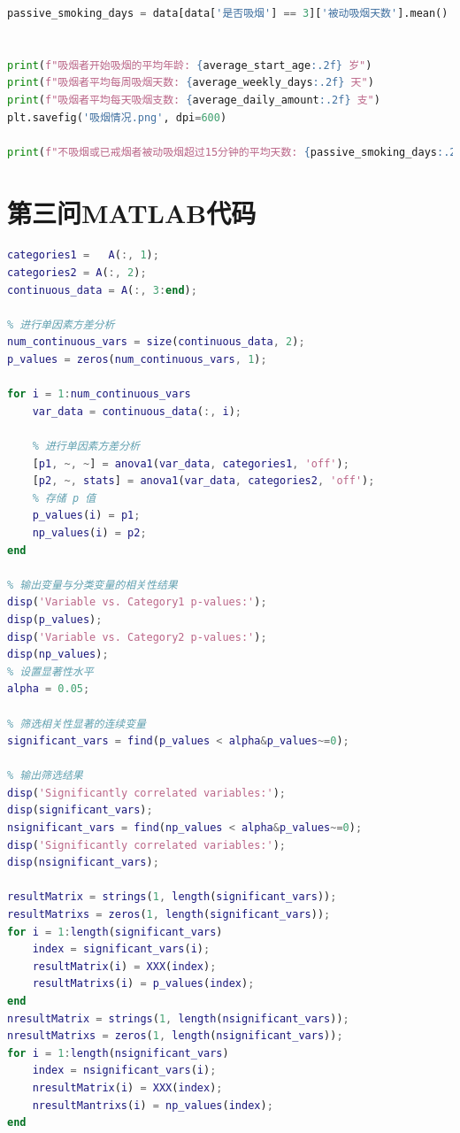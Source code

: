 \documentclass{cumcmthesis}
\begin{document}
\begin{appendices}
\begin{lstlisting}[language=python]
passive_smoking_days = data[data['是否吸烟'] == 3]['被动吸烟天数'].mean()


print(f"吸烟者开始吸烟的平均年龄: {average_start_age:.2f} 岁")
print(f"吸烟者平均每周吸烟天数: {average_weekly_days:.2f} 天")
print(f"吸烟者平均每天吸烟支数: {average_daily_amount:.2f} 支")
plt.savefig('吸烟情况.png', dpi=600)

print(f"不吸烟或已戒烟者被动吸烟超过15分钟的平均天数: {passive_smoking_days:.2f} 天")


\end{lstlisting}
\section{第三问MATLAB代码}
\begin{lstlisting}[language=matlab]
% 提取分类变量和其他连续变量
categories1 =   A(:, 1); 
categories2 = A(:, 2);   
continuous_data = A(:, 3:end); 

% 进行单因素方差分析
num_continuous_vars = size(continuous_data, 2);
p_values = zeros(num_continuous_vars, 1);

for i = 1:num_continuous_vars
    var_data = continuous_data(:, i);
    
    % 进行单因素方差分析
    [p1, ~, ~] = anova1(var_data, categories1, 'off');
    [p2, ~, stats] = anova1(var_data, categories2, 'off');
    % 存储 p 值
    p_values(i) = p1;
    np_values(i) = p2;
end

% 输出变量与分类变量的相关性结果
disp('Variable vs. Category1 p-values:');
disp(p_values);
disp('Variable vs. Category2 p-values:');
disp(np_values);
% 设置显著性水平
alpha = 0.05;

% 筛选相关性显著的连续变量
significant_vars = find(p_values < alpha&p_values~=0);

% 输出筛选结果
disp('Significantly correlated variables:');
disp(significant_vars);
nsignificant_vars = find(np_values < alpha&p_values~=0);
disp('Significantly correlated variables:');
disp(nsignificant_vars);

resultMatrix = strings(1, length(significant_vars));
resultMatrixs = zeros(1, length(significant_vars));
for i = 1:length(significant_vars)
    index = significant_vars(i);
    resultMatrix(i) = XXX(index);
    resultMatrixs(i) = p_values(index);
end
nresultMatrix = strings(1, length(nsignificant_vars));
nresultMatrixs = zeros(1, length(nsignificant_vars));
for i = 1:length(nsignificant_vars)
    index = nsignificant_vars(i);
    nresultMatrix(i) = XXX(index);
    nresultMantrixs(i) = np_values(index);
end


\end{lstlisting}
\end{appendices}
\end{document}
